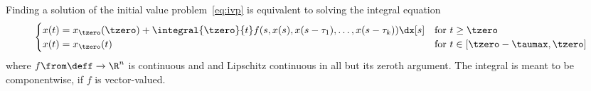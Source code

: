     \begin{lemma}\label{lm:integral-equation}
        Finding a solution of the initial value problem~\eqref{eq:ivp} is equivalent to solving the integral equation
        \begin{equation*}\label{eq:integral-equation}
            \begin{cases}
                x(t) = x_{\tzero}(\tzero) + \integral{\tzero}{t} f(s,x(s),x(s-\tau_1),\ldots,x(s-\tau_k))\dx[s] & \text{for } t\geq\tzero\\
                x(t) = x_{\tzero}(t) & \text{for } t\in [\tzero-\taumax,\tzero]
            \end{cases}
        \end{equation*}
        where $f\from\deff\to\R^n$ is continuous and and Lipschitz continuous in all but its zeroth argument.
        The integral is meant to be componentwise, if $f$ is vector-valued.
    \end{lemma}
